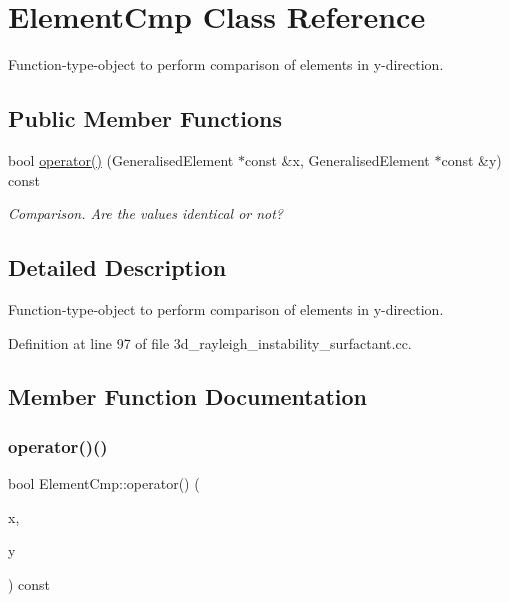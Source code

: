 \hypertarget{classElementCmp}{}\section{Element\+Cmp Class Reference}
\label{classElementCmp}


Function-\/type-\/object to perform comparison of elements in y-\/direction.  


\subsection*{Public Member Functions}
\begin{DoxyCompactItemize}
\item 
bool \hyperlink{classElementCmp_a42b23100428174dd82692ebb705bb86a}{operator()} (Generalised\+Element $\ast$const \&x, Generalised\+Element $\ast$const \&y) const
\begin{DoxyCompactList}\small\item\em Comparison. Are the values identical or not? \end{DoxyCompactList}\end{DoxyCompactItemize}


\subsection{Detailed Description}
Function-\/type-\/object to perform comparison of elements in y-\/direction. 

Definition at line 97 of file 3d\+\_\+rayleigh\+\_\+instability\+\_\+surfactant.\+cc.



\subsection{Member Function Documentation}
\mbox{\label{classElementCmp_a42b23100428174dd82692ebb705bb86a}} 
\subsubsection{\texorpdfstring{operator()()}{operator()()}}
{\footnotesize\ttfamily bool Element\+Cmp\+::operator() (\begin{DoxyParamCaption}\item[{Generalised\+Element $\ast$const \&}]{x,  }\item[{Generalised\+Element $\ast$const \&}]{y }\end{DoxyParamCaption}) const\hspace{0.3cm}{\ttfamily [inline]}}



